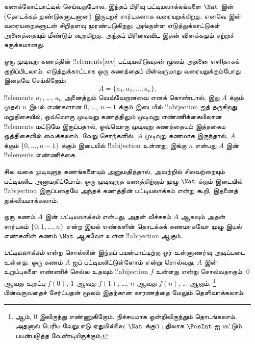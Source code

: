 \documentclass[../../../include/open-logic-section]{subfiles}
\begin{document}


\begin{editorial}
  கணக்கோட்பாட்டில் செய்வதுபோல, இந்தப் பிரிவு பட்டியலாக்கங்களை
  $\Nat$ இன் (தொடக்கத் துண்டுகளுடனான) இருபுறச் சார்புகளாக
  வரையறுக்கிறது.
  எனவே  இன் வரையறைகளுடன் சிறிதளவு முரண்படுகிறது;
  அங்குள்ள எடுத்துக்காட்டுகள் அனைத்தையும் மீண்டும் கூறுகிறது.
  அந்தப் பிரிவைவிட இதன் விளக்கமும் சற்றுச் சுருக்கமானது.
\end{editorial}

ஒரு முடிவுறு கணத்தின் !!{element}s[acc] பட்டியலிடுவதன் மூலம்
அதனை எளிதாகக் குறிப்பிடலாம். எடுத்துக்காட்டாக ஒரு கணத்தைப்
பின்வருமாறு வரையறுக்கும்போது இதையே செய்கிறோம்:
\[
  A = \{a_1, a_2, \ldots, a_n\}.
\]
!!{element}s $a_1$, \dots, $a_n$ அனைத்தும் வெவ்வேறானவை எனக் கொண்டால்,
இது $A$ க்கும் முதல் $n$ இயல் எண்களான
$0$, \dots, $n-1$ க்கும் இடையில் !!a{bijection} ஐத் தருகிறது.
மறுதிசையில், ஒவ்வொரு முடிவுறு கணத்திலும் முடிவுறு எண்ணிக்கையிலான
!!{element}s மட்டுமே இருப்பதால், ஒவ்வொரு முடிவுறு கணத்தையும்
இத்தகைய ஒத்திசைவில் வைக்கலாம்.
வேறு சொற்களில், $A$ முடிவுறு கணமாக இருந்தால்,
$A$ க்கும் $\{0, \dots, n-1\}$ க்கும் இடையில் !!a{bijection} உள்ளது;
இங்கு $n$ என்பது $A$ இன் !!{element}s எண்ணிக்கை.

சில வகை முடிவுறாத கணங்களையும் அனுமதித்தால்,
அவற்றில் சிலவற்றையும் பட்டியலிட அனுமதிப்போம்.
ஒரு முடிவுறாத கணத்திற்கும் முழு $\Nat$ க்கும் இடையில்
!!a{bijection} இருப்பதையே அந்தக் கணத்தின் பட்டியலாக்கம் என்று கூறி,
இதனைத் துல்லியமாக்கலாம்.

\begin{defn}[பட்டியலாக்கம் — கணக்கோட்பாட்டு வரையறை]
ஒரு கணம் $A$ இன் \emph{பட்டியலாக்கம்} என்பது,
அதன் வீச்சகம் $A$ ஆகவும் அதன் சார்பகம்
$\{0, 1, \ldots, n\}$ என்ற இயல் எண்களின் தொடக்கக் கணமாகவோ
முழு இயல் எண்களின் கணம் $\Nat$ ஆகவோ உள்ள !!a{bijection} ஆகும்.
\end{defn}

\begin{explain}
\emph{பட்டியலாக்கம்} என்ற சொல்லின் இந்தப் பயன்பாட்டிற்கு
ஓர் உள்ளுணர்வு அடிப்படை உள்ளது.
ஒரு கணம் $A$ ஐப் பட்டியலிட்டுள்ளோம் என்று சொல்வது,
$A$ இன் உறுப்புகளை எண்ணிச் செல்ல உதவும் !!a{bijection} $f$
உள்ளது என்று சொல்வதாகும்.
$0$ ஆவது உறுப்பு $f(0)$, $1$ ஆவது $f(1)$, \ldots,
$n$ ஆவது $f(n)$, \ldots{} ஆகும்.
\footnote{ஆம், $0$ இலிருந்து எண்ணுகிறோம்.
நிச்சயமாக ஒன்றிலிருந்தும் தொடங்கலாம். அதனால் பெரிய வேறுபாடு ஏதுமில்லை;
$\Nat$ க்குப் பதிலாக $\PosInt$ ஐ மட்டும் பயன்படுத்த வேண்டியிருக்கும்.}
பின்வருவதைச் சேர்ப்பதன் மூலம் இதற்கான காரணத்தை மேலும் தெளிவாக்கலாம்:
\end{explain}
\end{document}
